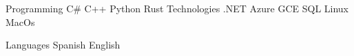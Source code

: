 


\begin{cvskills}

  \cvskill
    {Programming} %
    {
      {\enskip\cdotp\enskip} C\#
      {\enskip\cdotp\enskip} C++
      {\enskip\cdotp\enskip} Python
      {\enskip\cdotp\enskip} Rust
    } %
  \cvskill
    {Technologies} %
    {
      {\enskip\cdotp\enskip}.NET 
      {\enskip\cdotp\enskip} Azure 
      {\enskip\cdotp\enskip} GCE
      {\enskip\cdotp\enskip} SQL
      {\enskip\cdotp\enskip} Linux
      {\enskip\cdotp\enskip} MacOs
    } 

  \cvskill
    {Languages} %
    {{\enskip\cdotp\enskip}Spanish {\enskip\cdotp\enskip}English} %
\end{cvskills}